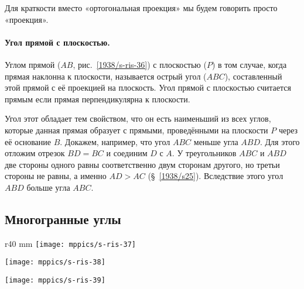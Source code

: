 Для краткости вместо «ортогональная проекция» мы будем говорить просто «проекция».

\paragraph{Угол прямой с плоскостью.}\label{1938/s48}
Углом прямой ($AB$, рис.~\ref{1938/s-ris-36}) с плоскостью ($P$) в том случае, когда прямая наклонна к плоскости, называется острый угол ($ABC$), составленный этой прямой с её проекцией на плоскость.
Угол прямой с плоскостью считается прямым если прямая перпендикулярна к плоскости.

Угол этот обладает тем свойством, что он есть наименьший из всех углов, которые данная прямая образует с прямыми, проведёнными на плоскости $P$ через её основание $B$.
Докажем, например, что угол $ABC$ меньше угла $ABD$.
Для этого отложим отрезок $BD=BC$ и соединим $D$ с $A$.
У треугольников $ABC$ и $ABD$ две стороны одного равны соответственно двум сторонам другого, но третьи стороны не равны, а именно $AD>AC$ (§~\ref{1938/s25}).
Вследствие этого угол $ABD$ больше угла $ABC$.

\subsection*{Многогранные углы}

\begin{wrapfigure}{r}{40 mm}
\vskip-4mm
\centering
\texttt{[image: mppics/s-ris-37]}
\caption{}\label{1938/s-ris-37}
\bigskip
\texttt{[image: mppics/s-ris-38]}
\caption{}\label{1938/s-ris-38}
\bigskip
\texttt{[image: mppics/s-ris-39]}
\caption{}\label{1938/s-ris-39}
\end{wrapfigure}

